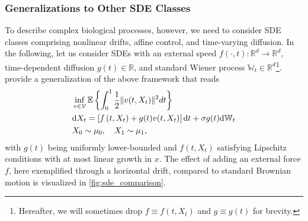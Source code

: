 \subsubsection*{Generalizations to Other SDE Classes}
To describe complex biological processes, however, we need to consider SDE classes comprising nonlinear drifts, affine control, and time-varying diffusion. 
In the following, let us consider SDEs with an external speed $f(\cdot, t): \mathbb{R}^d \rightarrow \mathbb{R}^d$, time-dependent diffusion $g(t) \in \mathbb{R}$, and standard Wiener process $\mathbb{W}_t \in \mathbb{R}^d$\footnote{Hereafter, we will sometimes drop $f \equiv f(t, X_t)$ and $g \equiv g(t)$ for brevity.}. \citet{caluya2021wasserstein, chen2021likelihood} provide a generalization of the above framework that reads
\begin{align}
\label{eq:sb_control_gen}
& \inf _{v \in \mathcal{V}} \mathbb{E}\left\{\int_0^1 \frac{1}{2}\lVert v(t, X_t)\rVert^2 d t\right\}\\
\label{eq:sb_control_constraint_gen}
& \mathrm{d} X_t=\left[f\left(t, X_t\right)+g(t) v(t, X_t)\right] \mathrm{d} t+\sigma g(t) \mathrm{d} \mathbb{W}_t
 \\
\nonumber & X_0 \sim \mu_0, \quad X_1 \sim \mu_1,
\end{align}
with $g(t)$ being uniformly lower-bounded and $f(t, X_t)$ satisfying Lipschitz conditions with at most linear growth in $x$.
The effect of adding an external force $f$, here exemplified through a horizontal drift, compared to standard Brownian motion is visualized in \cref{fig:sde_comparison}.

